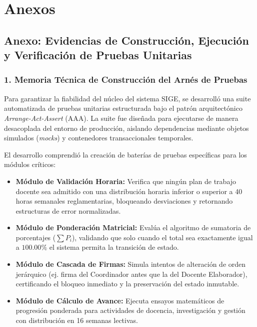 \documentclass[12pt,a4paper]{article}
\begin{document}
\vspace{0.4cm}

\section{Anexos}

\subsection*{Anexo: Evidencias de Construcción, Ejecución y Verificación de Pruebas Unitarias}

\subsubsection*{1. Memoria Técnica de Construcción del Arnés de Pruebas}
Para garantizar la fiabilidad del núcleo del sistema SIGE, se desarrolló una suite automatizada de pruebas unitarias estructurada bajo el patrón arquitectónico \textit{Arrange-Act-Assert} (AAA). La suite fue diseñada para ejecutarse de manera desacoplada del entorno de producción, aislando dependencias mediante objetos simulados (\textit{mocks}) y contenedores transaccionales temporales. 

El desarrollo comprendió la creación de baterías de pruebas específicas para los módulos críticos:
\begin{itemize}[leftmargin=1.5em, itemsep=2pt]
    \item \textbf{Módulo de Validación Horaria:} Verifica que ningún plan de trabajo docente sea admitido con una distribución horaria inferior o superior a 40 horas semanales reglamentarias, bloqueando desviaciones y retornando estructuras de error normalizadas.
    \item \textbf{Módulo de Ponderación Matricial:} Evalúa el algoritmo de sumatoria de porcentajes ($\sum P_i$), validando que solo cuando el total sea exactamente igual a $100.00\%$ el sistema permita la transición de estado.
    \item \textbf{Módulo de Cascada de Firmas:} Simula intentos de alteración de orden jerárquico (ej. firma del Coordinador antes que la del Docente Elaborador), certificando el bloqueo inmediato y la preservación del estado inmutable.
    \item \textbf{Módulo de Cálculo de Avance:} Ejecuta ensayos matemáticos de progresión ponderada para actividades de docencia, investigación y gestión con distribución en 16 semanas lectivas.
\end{itemize}
\end{document}
